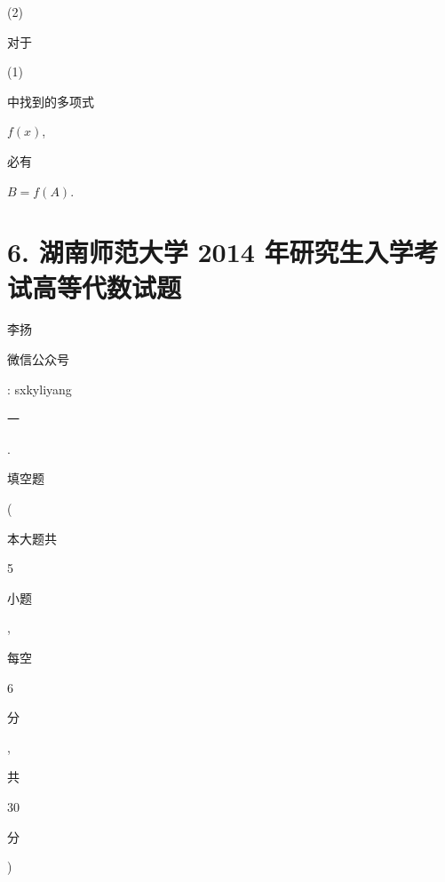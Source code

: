 \documentclass[10pt]{article}
\begin{document}
(2) \begin{CJK}{UTF8}{mj}对于\end{CJK} (1) \begin{CJK}{UTF8}{mj}中找到的多项式\end{CJK} $f(x)$, \begin{CJK}{UTF8}{mj}必有\end{CJK} $B=f(A)$.

\section{6. 湖南师范大学 2014 年研究生入学考试高等代数试题}
\begin{CJK}{UTF8}{mj}李扬\end{CJK}

\begin{CJK}{UTF8}{mj}微信公众号\end{CJK}: sxkyliyang

\begin{CJK}{UTF8}{mj}一\end{CJK}. \begin{CJK}{UTF8}{mj}填空题\end{CJK} (\begin{CJK}{UTF8}{mj}本大题共\end{CJK} 5 \begin{CJK}{UTF8}{mj}小题\end{CJK}, \begin{CJK}{UTF8}{mj}每空\end{CJK} 6 \begin{CJK}{UTF8}{mj}分\end{CJK}, \begin{CJK}{UTF8}{mj}共\end{CJK} 30 \begin{CJK}{UTF8}{mj}分\end{CJK})
\end{document}
